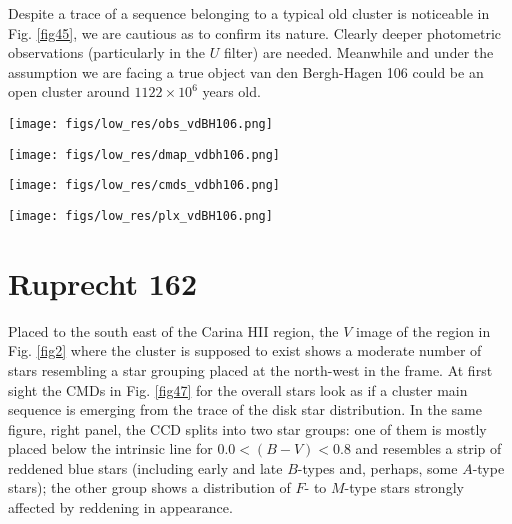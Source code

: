 \documentclass{aa}
\begin{document}
Despite a trace of a sequence belonging to a typical old cluster is
noticeable in Fig. \ref{fig45}, we are cautious as to confirm its nature.
Clearly deeper photometric observations (particularly in the $U$ filter) are
needed. Meanwhile and under the assumption we are facing a true object van
den Bergh-Hagen 106 could be an open cluster around $1122\times10^6$ years
old.

\begin{figure*}[ht]
    \centering
    \texttt{[image: figs/low\_res/obs\_vdBH106.png]}
    \caption{Idem Fig. \ref{fig3} for van den Bergh-Hagen 106.}
    \label{fig43}
\end{figure*}
\begin{figure*}[ht]
    \centering
    \texttt{[image: figs/low\_res/dmap\_vdbh106.png]}
    \caption{Idem Fig. \ref{fig4} for van den Bergh-Hagen 106.}
    \label{fig44}
\end{figure*}
\begin{figure*}[ht]
    \centering
    \texttt{[image: figs/low\_res/cmds\_vdbh106.png]}
    \caption{Idem Fig. \ref{fig5} for van den Bergh-Hagen 106.}
    \label{fig45}
\end{figure*}
\begin{figure*}[ht]
    \centering
    \texttt{[image: figs/low\_res/plx\_vdBH106.png]}
    \caption{Idem Fig. \ref{fig6} for van den Bergh-Hagen 106.}
    \label{fig46}
\end{figure*}



\section{Ruprecht 162}
\label{app:rup162}

Placed to the south east of the Carina HII region, the $V$ image of the region
in Fig. \ref{fig2} where the cluster is supposed to exist shows a moderate
number of stars resembling a star grouping placed at the north-west in the
frame. At first sight the CMDs in Fig. \ref{fig47} for the overall stars look
as if a cluster main sequence is emerging from the trace of the disk star
distribution.
In the same figure, right panel, the CCD splits into two star groups: one of
them is mostly placed below the intrinsic line for $0.0<(B-V)< 0.8$ and
resembles a strip of reddened blue stars (including early and late $B$-types
and, perhaps, some $A$-type stars); the other group shows a distribution of $F$-
to $M$-type stars strongly affected by reddening in appearance.\\
\end{document}
